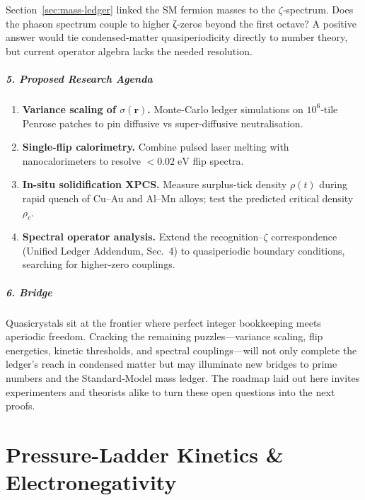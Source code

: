 \documentclass[11pt,oneside]{book}
\begin{document}
Section~\ref{sec:mass-ledger} linked the SM fermion masses to the
$\zeta$‐spectrum.
Does the phason spectrum couple to higher ζ-zeros
beyond the first octave?  
A positive answer would tie condensed‐matter quasiperiodicity directly to
number theory, but current operator algebra lacks the needed resolution.

\paragraph*{5. Proposed Research Agenda}

\begin{enumerate}[label=\textbf{\arabic*.},leftmargin=1.2cm]
\item \textbf{Variance scaling of \(\sigma(\mathbf r)\).}  
      Monte-Carlo ledger simulations on
      \(10^6\)‐tile Penrose patches to pin diffusive vs super-diffusive
      neutralisation.
\item \textbf{Single‐flip calorimetry.}  
      Combine pulsed laser melting with nanocalorimeters
      to resolve \(<0.02\;\text{eV}\) flip spectra.
\item \textbf{In-situ solidification XPCS.}  
      Measure surplus-tick density \(\rho(t)\) during rapid
      quench of Cu–Au and Al–Mn alloys; test the
      predicted critical density \(\rho_c\).
\item \textbf{Spectral operator analysis.}  
      Extend the recognition–\(\zeta\) correspondence
      (Unified Ledger Addendum, Sec.~4) to quasiperiodic
      boundary conditions, searching for higher‐zero couplings.
\end{enumerate}

\paragraph*{6. Bridge}

Quasicrystals sit at the frontier where perfect integer bookkeeping meets
aperiodic freedom.  
Cracking the remaining puzzles—variance scaling, flip energetics,
kinetic thresholds, and spectral couplings—will not only
complete the ledger’s reach in condensed matter
but may illuminate new bridges to prime numbers
and the Standard‐Model mass ledger.
The roadmap laid out here invites experimenters and theorists alike
to turn these open questions into the next proofs.

\bigskip
\chapter{Pressure-Ladder Kinetics \& Electronegativity}
\label{sec:pressure-electronegativity}
\end{document}
